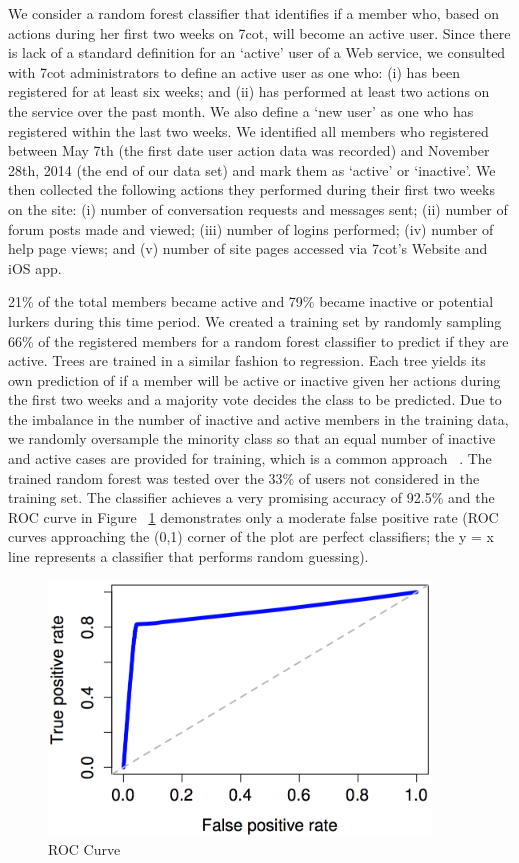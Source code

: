 We consider a random forest classifier that identifies if a member who, based on actions during her first two weeks on 7cot, will become an active user. Since there is lack of a standard definition for an ‘active’ user of a Web service, we consulted with 7cot administrators to define an active user as one who: (i) has been registered for at least six weeks; and (ii) has performed at least two actions on the service over the past month. We also define a ‘new user’ as one who has registered within the last two weeks. We identified all members who registered between May 7th (the first date user action data was recorded) and November 28th, 2014 (the end of our data set) and mark them as ‘active’ or ‘inactive’. We then collected the following actions they performed during their first two weeks on the site: (i) number of conversation requests and messages sent; (ii) number of forum posts made and viewed; (iii) number of logins performed; (iv) number of help page views; and (v) number of site pages accessed via 7cot’s Website and iOS app.

 21\% of the total members became active and 79\% became inactive or potential lurkers during this time period. We created a training set by randomly sampling 66\% of the registered members for a random forest classifier to predict if they are active. Trees are trained in a similar fashion to regression. Each tree yields its own prediction of if a member will be active or inactive given her actions during the first two weeks and a majority vote decides the class to be predicted. Due to the imbalance in the number of inactive and active members in the training data, we randomly oversample the minority class so that an equal number of inactive and active cases are provided for training, which is a common approach ~\cite{hastie2009unsupervised}. The trained random forest was tested over the 33\% of users not considered in the training set. The classifier achieves a very promising accuracy of 92.5\% and the ROC curve in Figure ~\ref{fig:5.4} demonstrates only a moderate false positive rate (ROC curves approaching the (0,1) corner of the plot are perfect classifiers; the y = x line represents a classifier that performs random guessing).

\begin{figure}
	\centering %
	\includegraphics[width=4in]{ROC.png} %
	\caption{ROC Curve} 
	\label{fig:5.4}
\end{figure}

